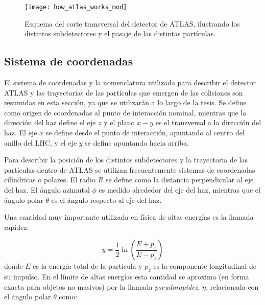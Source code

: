 \begin{figure}[!p]
  \centering

  \texttt{[image: how\_atlas\_works\_mod]}

  \caption{Esquema del corte transversal del detector de ATLAS, ilustrando los distintos
  subdetectores y el pasaje de las distintas partículas.}
  \label{fig:how_atlas_works}

\end{figure}


\subsection{Sistema de coordenadas}


El sistema de coordenadas y la nomenclatura utilizada para describir el detector
ATLAS y las trayectorias de las partículas que emergen de las colisiones son
resumidas en esta sección, ya que se utilizarán a lo largo de la tesis. Se
define como origen de coordenadas al punto de interacción nominal, mientras que
la dirección del haz define el eje $z$ y el plano $x-y$ es el transversal a la
dirección del haz. El eje $x$ se define desde el punto de interacción, apuntando
al centro del anillo del LHC, y el eje $y$ se define apuntando hacia arriba.

Para describir la posición de los distintos
subdetectores y la trayectoria de las partículas dentro de ATLAS se utilizan
frecuentemente sistemas de coordenadas cilíndricas o polares. El radio $R$ se
define como la distancia perpendicular al eje del haz. El ángulo azimutal $\phi
$ es medido alrededor del eje del haz, mientras que el ángulo polar $\theta$
es el ángulo respecto al eje del haz.

Una cantidad muy importante utilizada en física de altas energías es la
llamada rapidez:

\begin{equation}
  y = \frac{1}{2} \ln \left( \frac{E+p_z}{E-p_z} \right)
\end{equation}
%
donde $E$ es la energía total de la partícula y $p_z$ es la componente
longitudinal de su impulso. En el límite de altas energías esta cantidad se
aproxima (en forma exacta para objetos no masivos) por la llamada
\emph{pseudorapidez}, $\eta$, relacionada con el ángulo polar $\theta$ como:

